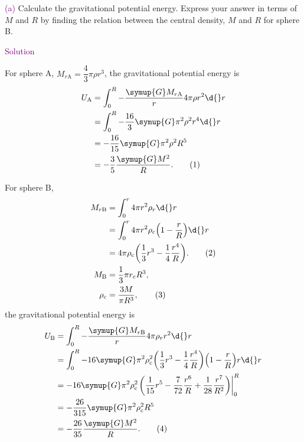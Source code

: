 \documentclass[UTF8, 12pt, a4paper, oneside, twocolumn, fontset=none]{ctexart}
\begin{document}
\hspace*{\fill}

\noindent\textcolor{purple}{(a)} Calculate the gravitational potential energy. Express your answer in terms of $M$ and $R$ by finding the relation between the central density, $M$ and $R$ for sphere B.

\hspace*{\fill}

\noindent\textcolor{purple}{Solution}

For sphere A, $M_{r\text{A}}=\dfrac{4}{3}\pi\rho{}r^{3}$, the gravitational potential energy is
\begin{align}
U_{\text{A}}&=\int_{0}^{R}-\frac{\symup{G}M_{r\text{A}}}{r}4\pi\rho{}r^{2}\d{}r\notag\\
&=\int_{0}^{R}-\frac{16}{3}\symup{G}\pi^{2}\rho^{2}r^{4}\d{}r\notag\\
&=-\frac{16}{15}\symup{G}\pi^{2}\rho^{2}R^{5}\notag\\
&=-\frac{3}{5}\frac{\symup{G}M^{2}}{R}.\tag{1}
\end{align}


For sphere B,
\begin{align}
M_{r\text{B}}&=\int_{0}^{r}4\pi{}r^{2}\rho_{r}\d{}r\notag\\
&=\int_{0}^{r}4\pi{}r^{2}\rho_{\mathrm{c}}\mleft(1-\frac{r}{R}\mright)\d{}r\notag\\
&=4\pi\rho_{\mathrm{c}}\mleft(\frac{1}{3}r^{3}-\frac{1}{4}\frac{r^{4}}{R}\mright).\tag{2}\\
M_{\text{B}}&=\frac{1}{3}\pi{}r_{\mathrm{c}}R^{3},\notag\\
\rho_{\mathrm{c}}&=\frac{3M}{\pi R^{3}},\tag{3}
\end{align}
the gravitational potential energy is
\begin{align}
U_{\text{B}}&=\int_{0}^{R}-\frac{\symup{G}M_{r\text{B}}}{r}4\pi\rho_{r}r^{2}\d{}r\notag\\
&=\int_{0}^{R}-16\symup{G}\pi^{2}\rho_{\mathrm{c}}^{2}\mleft(\frac{1}{3}r^{3}-\frac{1}{4}\frac{r^{4}}{R}\mright)\mleft(1-\frac{r}{R}\mright) r\d{}r\notag\\
&=-16\symup{G}\pi^{2}\rho_{\mathrm{c}}^{2}\mleft.\mleft(\frac{1}{15}r^{5}-\frac{7}{72}\frac{r^{6}}{R}+\frac{1}{28}\frac{r^{7}}{R^{2}}\mright)\mright\vert_{0}^{R}\notag\\
&=-\frac{26}{315}\symup{G}\pi^{2}\rho_{\mathrm{c}}^{2}R^{5}\notag\\
&=-\frac{26}{35}\frac{\symup{G}M^{2}}{R}.\tag{4}
\end{align}
\end{document}
